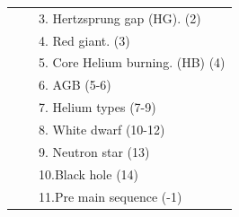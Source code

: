 \begin{longtable}{||p{0.42in}|p{0.25in}|p{0.6in}|p{0.6in}|p{0.4in}|p{2.3in}||}
\multicolumn{6}{|p{5.4in}|}{~~~~3. Hertzsprung gap (HG). (2)           }\\ 
\multicolumn{6}{|p{5.4in}|}{~~~~4. Red giant. (3)                      }\\ 
\multicolumn{6}{|p{5.4in}|}{~~~~5. Core Helium burning. (HB) (4)       }\\ 
\multicolumn{6}{|p{5.4in}|}{~~~~6. AGB (5-6)                           }\\ 
\multicolumn{6}{|p{5.4in}|}{~~~~7. Helium types (7-9)                  }\\ 
\multicolumn{6}{|p{5.4in}|}{~~~~8. White dwarf (10-12)                 }\\ 
\multicolumn{6}{|p{5.4in}|}{~~~~9. Neutron star (13)                   }\\ 
\multicolumn{6}{|p{5.4in}|}{~~~~10.Black hole (14)                     }\\ 
\multicolumn{6}{|p{5.4in}|}{~~~~11.Pre main sequence (-1)              }\\ 
\hline\hline



\end{longtable}
